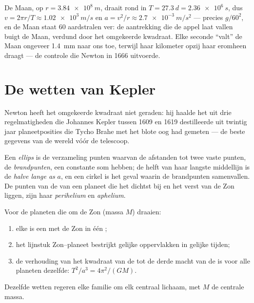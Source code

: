 \begin{example}\label{ex:g12:satellites-kepler:moon}
De Maan, op $r = \qty{3.84e8}{m}$, draait rond in $T = \qty{27.3}{d} =
\qty{2.36e6}{s}$, dus $v = 2\pi r/T \approx \qty{1.02e3}{m/s}$ en
$a = v^2/r \approx \qty{2.7e-3}{m/s^2}$ --- precies $g/60^2$, en de Maan
staat $60$ aardstralen ver: de aantrekking die de appel laat vallen buigt de
Maan, verdund door het omgekeerde kwadraat. Elke seconde ``valt'' de Maan
ongeveer \qty{1.4}{mm} naar ons toe, terwijl haar kilometer opzij haar
eromheen draagt --- de controle die Newton in 1666 uitvoerde.
\end{example}

\section{De wetten van Kepler}

Newton heeft het omgekeerde kwadraat niet geraden: hij haalde het uit drie
regelmatigheden die Johannes Kepler tussen 1609 en 1619 destilleerde uit
twintig jaar planeetposities die Tycho Brahe met het blote oog had gemeten
--- de beste gegevens van de wereld vóór de telescoop.

\begin{definition}[Ellips]\label{def:g12:satellites-kepler:ellipse}
Een \emph{ellips} is de verzameling punten waarvan de afstanden
tot twee vaste punten, de \emph{brandpunten}, een constante
som hebben; de helft van haar langste middellijn is de \emph{halve lange
as} $a$, en een cirkel is het geval waarin de
brandpunten samenvallen. De punten van de  van een planeet die het
dichtst bij en het verst van de Zon liggen, zijn haar
\emph{perihelium} en \emph{aphelium}.
\end{definition}

\begin{theorem}\label{thm:g12:satellites-kepler:kepler}
%
Voor de planeten die om de Zon (massa $M$) draaien:
\begin{enumerate}
  \item elke  is een  met de Zon in één ;
  \item het lijnstuk Zon--planeet bestrijkt gelijke oppervlakken in gelijke
        tijden;
  \item de verhouding van het kwadraat van de  tot de derde macht
        van de  is voor alle planeten dezelfde:
        $T^2/a^3 = 4\pi^2/(G M)$.
\end{enumerate}
Dezelfde wetten regeren elke familie  om elk centraal lichaam,
met $M$ de centrale massa. \admitted
\end{theorem}

